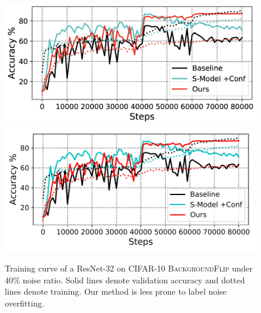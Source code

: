\begin{figure}[h]
\centering
\iflatexml
\includegraphics[width=6\columnwidth]{figures/cifar-10-curve.png}
\else
\includegraphics[width=0.9\columnwidth]{figures/cifar-10-curve.pdf}
\fi
\vspace{-0.1in}
\caption{Training curve of a ResNet-32 on CIFAR-10 \textsc{BackgroundFlip} under 40\% noise ratio.
Solid lines denote validation accuracy and dotted lines denote training. Our method is less prone to
label noise overfitting.}
\label{fig:curve}
\vspace{-0.15in}
\end{figure}
